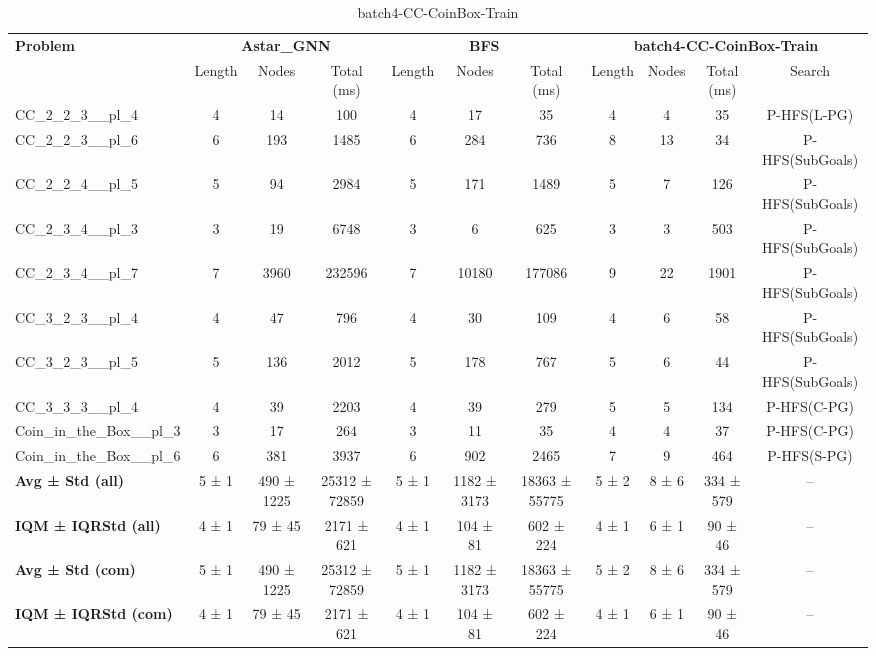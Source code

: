 \begin{table}[!ht]
\centering
\scriptsize
\begin{tabular}{l|ccc|ccc|cccc}
\multirow{2}{*}{\textbf{Problem}} & \multicolumn{3}{c|}{\textbf{Astar\_GNN}} & \multicolumn{3}{c|}{\textbf{BFS}} & \multicolumn{4}{c}{\textbf{batch4-CC-CoinBox-Train}} \\
\cline{2-11}
& Length & Nodes & Total (ms) & Length & Nodes & Total (ms) & Length & Nodes & Total (ms) & Search \\
\hline
CC\_2\_2\_3\_\_pl\_4 & 4 & 14 & 100 & 4 & 17 & 35 & 4 & 4 & 35 & P-HFS(L-PG) \\
CC\_2\_2\_3\_\_pl\_6 & 6 & 193 & 1485 & 6 & 284 & 736 & 8 & 13 & 34 & P-HFS(SubGoals) \\
CC\_2\_2\_4\_\_pl\_5 & 5 & 94 & 2984 & 5 & 171 & 1489 & 5 & 7 & 126 & P-HFS(SubGoals) \\
CC\_2\_3\_4\_\_pl\_3 & 3 & 19 & 6748 & 3 & 6 & 625 & 3 & 3 & 503 & P-HFS(SubGoals) \\
CC\_2\_3\_4\_\_pl\_7 & 7 & 3960 & 232596 & 7 & 10180 & 177086 & 9 & 22 & 1901 & P-HFS(SubGoals) \\
CC\_3\_2\_3\_\_pl\_4 & 4 & 47 & 796 & 4 & 30 & 109 & 4 & 6 & 58 & P-HFS(SubGoals) \\
CC\_3\_2\_3\_\_pl\_5 & 5 & 136 & 2012 & 5 & 178 & 767 & 5 & 6 & 44 & P-HFS(SubGoals) \\
CC\_3\_3\_3\_\_pl\_4 & 4 & 39 & 2203 & 4 & 39 & 279 & 5 & 5 & 134 & P-HFS(C-PG) \\
Coin\_in\_the\_Box\_\_pl\_3 & 3 & 17 & 264 & 3 & 11 & 35 & 4 & 4 & 37 & P-HFS(C-PG) \\
Coin\_in\_the\_Box\_\_pl\_6 & 6 & 381 & 3937 & 6 & 902 & 2465 & 7 & 9 & 464 & P-HFS(S-PG) \\
\hline
\textbf{Avg ± Std (all)} & 5 ± 1 & 490 ± 1225 & 25312 ± 72859 & 5 ± 1 & 1182 ± 3173 & 18363 ± 55775 & 5 ± 2 & 8 ± 6 & 334 ± 579 & -- \\
\textbf{IQM ± IQRStd (all)} & 4 ± 1 & 79 ± 45 & 2171 ± 621 & 4 ± 1 & 104 ± 81 & 602 ± 224 & 4 ± 1 & 6 ± 1 & 90 ± 46 & -- \\
\textbf{Avg ± Std (com)} & 5 ± 1 & 490 ± 1225 & 25312 ± 72859 & 5 ± 1 & 1182 ± 3173 & 18363 ± 55775 & 5 ± 2 & 8 ± 6 & 334 ± 579 & -- \\
\textbf{IQM ± IQRStd (com)} & 4 ± 1 & 79 ± 45 & 2171 ± 621 & 4 ± 1 & 104 ± 81 & 602 ± 224 & 4 ± 1 & 6 ± 1 & 90 ± 46 & -- \\
\end{tabular}
\caption{batch4-CC-CoinBox-Train}
\label{tab:batch4_CC-CoinBox_comparison_train}
\end{table}

